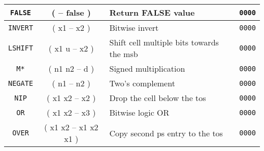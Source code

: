 \begin{center}
\begin{longtable}{|c|c|l|c|}
      \texttt{FALSE}                          &
      ( -- false )                            &
      Return FALSE value                      &
      \texttt{0000}                           \\ \hline
                              
      \texttt{INVERT}                         &
      ( x1 -- x2 )                            &
      Bitwise invert                          &
      \texttt{0000}                           \\ \hline

      \texttt{LSHIFT}                         &
      ( x1 u -- x2 )                          &
      Shift cell multiple bits towards the \gls{msb} &
      \texttt{0000}                           \\ \hline

      \texttt{M*}                             &
      ( n1 n2 -- d )                          &
      Signed multiplication                   &
      \texttt{0000}                           \\ \hline

      \texttt{NEGATE}                         &
      ( n1 -- n2 )                            &
      Two's complement                        &
      \texttt{0000}                           \\ \hline

      \texttt{NIP}                            &
      ( x1 x2 -- x2 )                         &
      Drop the cell below the \gls{tos}       &
      \texttt{0000}                           \\ \hline
                              
      \texttt{OR}                            &
      ( x1 x2 -- x3 )                        &
      Bitwise logic OR                       &
      \texttt{0000}                           \\ \hline
                                         
      \texttt{OVER}                          &
      ( x1 x2 -- x1 x2 x1 )                  &
      Copy second \gls{ps} entry to the \gls{tos} &
      \texttt{0000}                           \\ \hline
                                         

\end{longtable}
\end{center}
